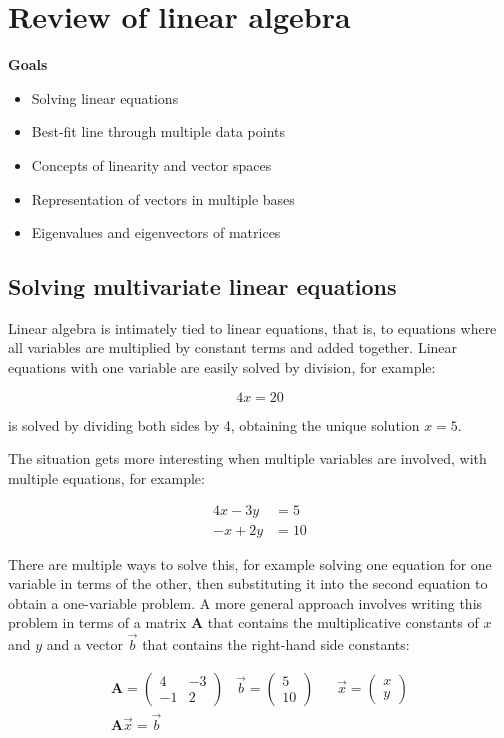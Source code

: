 \documentclass[
  letterpaper,
  DIV=11,
  numbers=noendperiod]{scrreprt}
\providecommand{\tightlist}{%
  \setlength{\itemsep}{0pt}\setlength{\parskip}{0pt}}\usepackage{longtable,booktabs,array}
\begin{document}

\chapter{Review of linear algebra}\label{review-of-linear-algebra}

\textbf{Goals}

\begin{itemize}
\tightlist
\item
  Solving linear equations
\item
  Best-fit line through multiple data points
\item
  Concepts of linearity and vector spaces
\item
  Representation of vectors in multiple bases
\item
  Eigenvalues and eigenvectors of matrices
\end{itemize}

\section{Solving multivariate linear
equations}\label{solving-multivariate-linear-equations}

Linear algebra is intimately tied to linear equations, that is, to
equations where all variables are multiplied by constant terms and added
together. Linear equations with one variable are easily solved by
division, for example:

\[
4x = 20
\]

is solved by dividing both sides by 4, obtaining the unique solution
\(x=5\).

The situation gets more interesting when multiple variables are
involved, with multiple equations, for example:

\[
\begin{aligned}
4x - 3y &= 5 \\
 -x + 2y &= 10
\end{aligned}
\]

There are multiple ways to solve this, for example solving one equation
for one variable in terms of the other, then substituting it into the
second equation to obtain a one-variable problem. A more general
approach involves writing this problem in terms of a matrix
\(\mathbf A\) that contains the multiplicative constants of \(x\) and
\(y\) and a vector \(\vec b\) that contains the right-hand side
constants:

\[
\begin{aligned}
\mathbf{A} = \begin{pmatrix} 4 & -3 \\ -1 & 2 \end{pmatrix} \;\;\; \vec{b} = \begin{pmatrix}5 \\ 10 \end{pmatrix} &\;\;\;
\vec{x} = \begin{pmatrix} x \\ y \end{pmatrix} \\
\mathbf{A} \vec x = \vec b &
\end{aligned}
\]
\end{document}
